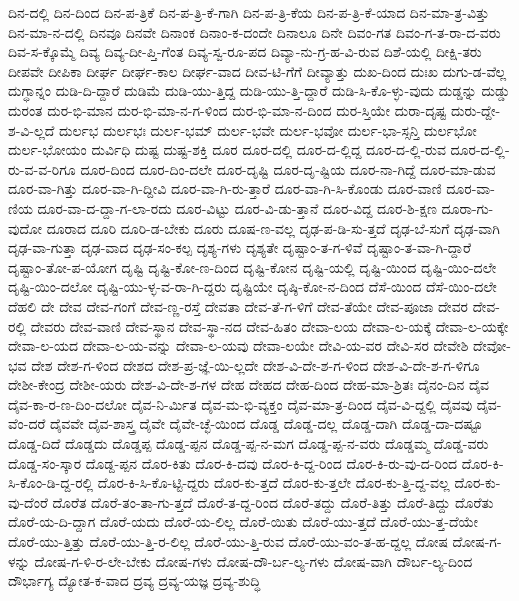 {ದಿನ-ದಲ್ಲಿ
ದಿನ-ದಿಂದ
ದಿನ-ಪ-ತ್ರಿಕೆ
ದಿನ-ಪ-ತ್ರಿ-ಕೆ-ಗಾಗಿ
ದಿನ-ಪ-ತ್ರಿ-ಕೆಯ
ದಿನ-ಪ-ತ್ರಿ-ಕೆ-ಯಾದ
ದಿನ-ಮಾ-ತ್ರ-ವಿತ್ತು
ದಿನ-ಮಾ-ನ-ದಲ್ಲಿ
ದಿನವೂ
ದಿನವೇ
ದಿನಾಂಕ
ದಿನಾಂ-ಕ-ದಂದೇ
ದಿನಾಲೂ
ದಿನೇ
ದಿವಂ-ಗತ
ದಿವಂ-ಗ-ತ-ರಾ-ದ-ವರು
ದಿವ-ಸ-ಕ್ಕೊಮ್ಮೆ
ದಿವ್ಯ
ದಿವ್ಯ-ದೀ-ಪ್ತಿ-ಗೆಂತ
ದಿವ್ಯ-ಸ್ವ-ರೂ-ಪದ
ದಿವ್ಯಾ-ನು-ಗ್ರ-ಹ-ವಿ-ರುವ
ದಿಶೆ-ಯಲ್ಲಿ
ದೀಕ್ಷಿ-ತರು
ದೀಪವೇ
ದೀಪಿಕಾ
ದೀರ್ಘ
ದೀರ್ಘ-ಕಾಲ
ದೀರ್ಘ-ವಾದ
ದೀವ-ಟಿ-ಗೆಗೆ
ದೀವ್ಯಾತ್ತು
ದುಖ-ದಿಂದ
ದುಃಖ
ದುಗು-ಡ-ವೆಲ್ಲ
ದುಗ್ಧಾನ್ನಂ
ದುಡಿ-ದಿ-ದ್ದಾರೆ
ದುಡಿಮೆ
ದುಡಿ-ಯು-ತ್ತಿದ್ದ
ದುಡಿ-ಯು-ತ್ತಿ-ದ್ದಾರೆ
ದುಡಿ-ಸಿ-ಕೊ-ಳ್ಳು-ವುದು
ದುಡ್ಡನ್ನು
ದುಡ್ಡು
ದುರಂತ
ದುರ-ಭಿ-ಮಾನ
ದುರ-ಭಿ-ಮಾ-ನ-ಗ-ಳಿಂದ
ದುರ-ಭಿ-ಮಾ-ನ-ದಿಂದ
ದುರ-ಸ್ತಿಯೇ
ದುರಾ-ದೃಷ್ಟ
ದುರು-ದ್ದೇ-ಶ-ವಿ-ಲ್ಲದೆ
ದುರ್ಲಭ
ದುರ್ಲಭಃ
ದುರ್ಲ-ಭಮ್
ದುರ್ಲ-ಭವೇ
ದುರ್ಲ-ಭವೋ
ದುರ್ಲ-ಭಾ-ಸ್ಸನ್ತಿ
ದುರ್ಲಭೋ
ದುರ್ಲ-ಭೋಯಂ
ದುರ್ವಿಧಿ
ದುಷ್ಟ
ದುಷ್ಟ-ಶಕ್ತಿ
ದೂರ
ದೂರ-ದಲ್ಲಿ
ದೂರ-ದ-ಲ್ಲಿದ್ದ
ದೂರ-ದ-ಲ್ಲಿ-ರುವ
ದೂರ-ದ-ಲ್ಲಿ-ರು-ವ-ವ-ರಿಗೂ
ದೂರ-ದಿಂದ
ದೂರ-ದಿಂ-ದಲೇ
ದೂರ-ದೃಷ್ಟಿ
ದೂರ-ದೃ-ಷ್ಟಿಯ
ದೂರ-ನಾ-ಗಿದ್ದೆ
ದೂರ-ಮಾ-ಡುವ
ದೂರ-ವಾ-ಗಿತ್ತು
ದೂರ-ವಾ-ಗಿ-ದ್ದೀವಿ
ದೂರ-ವಾ-ಗಿ-ರು-ತ್ತಾರೆ
ದೂರ-ವಾ-ಗಿ-ಸಿ-ಕೊಂಡು
ದೂರ-ವಾಣಿ
ದೂರ-ವಾ-ಣಿಯ
ದೂರ-ವಾ-ದ-ದ್ದಾ-ಗ-ಲಾ-ರದು
ದೂರ-ವಿಟ್ಟು
ದೂರ-ವಿ-ಡು-ತ್ತಾನೆ
ದೂರ-ವಿದ್ದ
ದೂರ-ಶಿ-ಕ್ಷಣ
ದೂರಾ-ಗು-ವುದೋ
ದೂರಾದ
ದೂರಿ
ದೂರಿ-ಡ-ಬೇಕು
ದೂರು
ದೂಷ-ಣ-ವಲ್ಲ
ದೃಢ-ಪ-ಡಿ-ಸು-ತ್ತದೆ
ದೃಢ-ಬೆ-ಸುಗೆ
ದೃಢ-ವಾಗಿ
ದೃಢ-ವಾ-ಗುತ್ತಾ
ದೃಢ-ವಾದ
ದೃಢ-ಸಂ-ಕಲ್ಪ
ದೃಶ್ಯ-ಗಳು
ದೃಶ್ಯತೇ
ದೃಷ್ಟಾಂ-ತ-ಗ-ಳಿವೆ
ದೃಷ್ಟಾಂ-ತ-ವಾ-ಗಿ-ದ್ದಾರೆ
ದೃಷ್ಟಾಂ-ತೋ-ಪ-ಯೋಗ
ದೃಷ್ಟಿ
ದೃಷ್ಟಿ-ಕೋ-ಣ-ದಿಂದ
ದೃಷ್ಟಿ-ಕೋನ
ದೃಷ್ಟಿ-ಯಲ್ಲಿ
ದೃಷ್ಟಿ-ಯಿಂದ
ದೃಷ್ಟಿ-ಯಿಂ-ದಲೇ
ದೃಷ್ಟಿ-ಯಿಂ-ದಲೋ
ದೃಷ್ಟಿ-ಯು-ಳ್ಳ-ವ-ರಾ-ಗಿ-ದ್ದರು
ದೃಷ್ಟಿಯೇ
ದೃಷ್ಠಿ-ಕೋ-ನ-ದಿಂದ
ದೆಸೆ-ಯಿಂದ
ದೆಸೆ-ಯಿಂ-ದಲೇ
ದೆಹಲಿ
ದೇ
ದೇವ
ದೇವ-ಗಂಗೆ
ದೇವ-ಣ್ಣ-ರಸ್ತೆ
ದೇವತಾ
ದೇವ-ತೆ-ಗ-ಳಿಗೆ
ದೇವ-ತೆಯೇ
ದೇವ-ಪೂಜಾ
ದೇವರ
ದೇವ-ರಲ್ಲಿ
ದೇವರು
ದೇವ-ವಾಣಿ
ದೇವ-ಸ್ಥಾನ
ದೇವ-ಸ್ಥಾ-ನದ
ದೇವ-ಹಿತಂ
ದೇವಾ-ಲಯ
ದೇವಾ-ಲ-ಯಕ್ಕೆ
ದೇವಾ-ಲ-ಯಕ್ಕೇ
ದೇವಾ-ಲ-ಯದ
ದೇವಾ-ಲ-ಯ-ವನ್ನು
ದೇವಾ-ಲ-ಯವು
ದೇವಾ-ಲಯೇ
ದೇವಿ-ಯ-ವರ
ದೇವಿ-ಸರ
ದೇವೇಶಿ
ದೇವೋ-ಭವ
ದೇಶ
ದೇಶ-ಗ-ಳಿಂದ
ದೇಶದ
ದೇಶ-ಪ್ರ-ಜ್ಞೆ-ಯಿ-ಲ್ಲದೇ
ದೇಶ-ವಿ-ದೇ-ಶ-ಗ-ಳಿಂದ
ದೇಶ-ವಿ-ದೇ-ಶ-ಗ-ಳಿಗೂ
ದೇಶೀ-ಕೇಂದ್ರ
ದೇಶೀ-ಯರು
ದೇಶ-ವಿ-ದೇ-ಶ-ಗಳ
ದೇಹ
ದೇಹದ
ದೇಹ-ದಿಂದ
ದೇಹ-ಮಾ-ಶ್ರಿತಃ
ದೈನಂ-ದಿನ
ದೈವ
ದೈವ-ಕಾ-ರ-ಣ-ದಿಂ-ದಲೋ
ದೈವ-ನಿ-ರ್ಮಿತ
ದೈವ-ಮ-ಭಿ-ವ್ಯಕ್ತಂ
ದೈವ-ಮಾ-ತ್ರ-ದಿಂದ
ದೈವ-ವಿ-ದ್ದಲ್ಲಿ
ದೈವವು
ದೈವ-ವೆಂ-ದರೆ
ದೈವವೇ
ದೈವ-ಶಾಸ್ತ್ರ
ದೈವೇ
ದೈವೇ-ಚ್ಛೆ-ಯಿಂದ
ದೊಡ್ಡ
ದೊಡ್ಡ-ದಲ್ಲ
ದೊಡ್ಡ-ದಾಗಿ
ದೊಡ್ಡ-ದಾ-ದಷ್ಟೂ
ದೊಡ್ಡ-ದಿದೆ
ದೊಡ್ಡದು
ದೊಡ್ಡಪ್ಪ
ದೊಡ್ಡ-ಪ್ಪನ
ದೊಡ್ಡ-ಪ್ಪ-ನ-ಮಗ
ದೊಡ್ಡ-ಪ್ಪ-ನ-ವರು
ದೊಡ್ಡಮ್ಮ
ದೊಡ್ಡ-ವರು
ದೊಡ್ಡ-ಸಂ-ಸ್ಕಾರ
ದೊಡ್ದ-ಪ್ಪನ
ದೊರ-ಕಿತು
ದೊರ-ಕಿ-ದವು
ದೊರ-ಕಿ-ದ್ದ-ರಿಂದ
ದೊರ-ಕಿ-ರು-ವು-ದ-ರಿಂದ
ದೊರ-ಕಿ-ಸಿ-ಕೊಂ-ಡಿ-ದ್ದ-ರಲ್ಲಿ
ದೊರ-ಕಿ-ಸಿ-ಕೊ-ಟ್ಟಿ-ದ್ದರು
ದೊರ-ಕು-ತ್ತದೆ
ದೊರ-ಕು-ತ್ತಲೇ
ದೊರ-ಕು-ತ್ತಿ-ದ್ದ-ವಲ್ಲ
ದೊರ-ಕು-ವು-ದೆಂರೆ
ದೊರೆತ
ದೊರೆ-ತಂ-ತಾ-ಗು-ತ್ತದೆ
ದೊರೆ-ತ-ದ್ದ-ರಿಂದ
ದೊರೆ-ತದ್ದು
ದೊರೆ-ತಿತ್ತು
ದೊರೆ-ತಿದ್ದು
ದೊರೆತು
ದೊರೆ-ಯ-ದಿ-ದ್ದಾಗ
ದೊರೆ-ಯದು
ದೊರೆ-ಯ-ಲಿಲ್ಲ
ದೊರೆ-ಯಿತು
ದೊರೆ-ಯು-ತ್ತದೆ
ದೊರೆ-ಯು-ತ್ತ-ದೆಯೇ
ದೊರೆ-ಯು-ತ್ತಿತ್ತು
ದೊರೆ-ಯು-ತ್ತಿ-ರ-ಲಿಲ್ಲ
ದೊರೆ-ಯು-ತ್ತಿ-ರುವ
ದೊರೆ-ಯು-ವಂ-ತ-ಹ-ದ್ದಲ್ಲ
ದೋಷ
ದೋಷ-ಗ-ಳನ್ನು
ದೋಷ-ಗ-ಳಿ-ರ-ಲೇ-ಬೇಕು
ದೋಷ-ಗಳು
ದೋಷ-ದೌ-ರ್ಬ-ಲ್ಯ-ಗಳು
ದೋಷ-ವಾಗಿ
ದೌರ್ಬ-ಲ್ಯ-ದಿಂದ
ದೌರ್ಭಾಗ್ಯ
ದ್ಯೋತ-ಕ-ವಾದ
ದ್ರವ್ಯ
ದ್ರವ್ಯ-ಯಜ್ಞ
ದ್ರವ್ಯ-ಶುದ್ಧಿ
}
